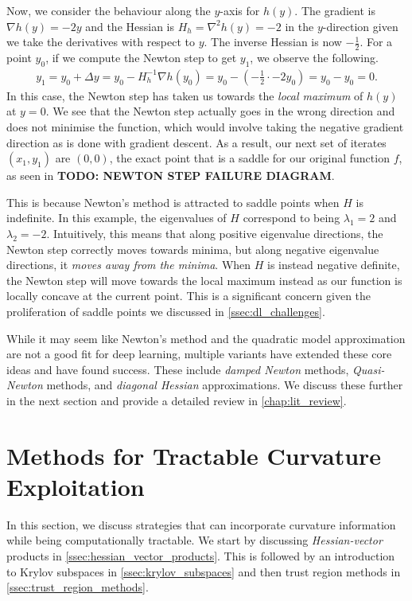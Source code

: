 Now, we consider the behaviour along the $y$-axis for $h(y)$. The gradient is $\nabla h(y) = -2y$ and the Hessian is $H_h = \nabla^2 h(y) = -2$ in the $y$-direction given we take the derivatives with respect to $y$. The inverse Hessian is now $-\frac{1}{2}$. For a point $y_0$, if we compute the Newton step to get $y_1$, we observe the following.
\begin{align}
    y_1 = y_0 + \Delta y = y_0 - H_h^{-1} \nabla h(y_0) = y_0 - \left(-\frac{1}{2} \cdot -2 y_0\right) = y_0 - y_0 = 0.
\end{align}
In this case, the Newton step has taken us towards the \textit{local maximum} of $h(y)$ at $y = 0$. We see that the Newton step actually goes in the wrong direction and does not minimise the function, which would involve taking the negative gradient direction as is done with gradient descent. As a result, our next set of iterates $(x_1, y_1)$ are $(0, 0)$, the exact point that is a saddle for our original function $f$, as seen in \textbf{TODO: NEWTON STEP FAILURE DIAGRAM}.

This is because Newton's method is attracted to saddle points when $H$ is indefinite. In this example, the eigenvalues of $H$ correspond to being $\lambda_1 = 2$ and $\lambda_2 = -2$. Intuitively, this means that along positive eigenvalue directions, the Newton step correctly moves towards minima, but along negative eigenvalue directions, it \textit{moves away from the minima}. When $H$ is instead negative definite, the Newton step will move towards the local maximum instead as our function is locally concave at the current point. This is a significant concern given the proliferation of saddle points we discussed in \cref{ssec:dl_challenges}. 

While it may seem like Newton's method and the quadratic model approximation are not a good fit for deep learning, multiple variants have extended these core ideas and have found success. These include \textit{damped Newton} methods, \textit{Quasi-Newton} methods, and \textit{diagonal Hessian} approximations. We discuss these further in the next section and provide a detailed review in \cref{chap:lit_review}.

\section{Methods for Tractable Curvature Exploitation}
\label{sec:tractable_curvature_exploitation}

In this section, we discuss strategies that can incorporate curvature information while being computationally tractable. We start by discussing \textit{Hessian-vector} products in \cref{ssec:hessian_vector_products}. This is followed by an introduction to Krylov subspaces in \cref{ssec:krylov_subspaces} and then trust region methods in \cref{ssec:trust_region_methods}.

